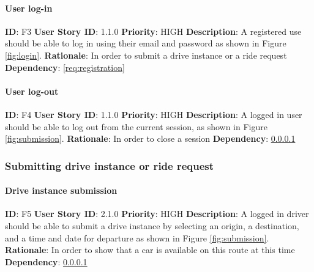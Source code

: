 \documentclass{article}
\begin{document}
\paragraph{User log-in}\label{req:log-in}
\textbf{ID}: F3\newline
\textbf{User Story ID}: 1.1.0\newline
\textbf{Priority}: HIGH\newline
\textbf{Description}: A registered use should be able to log in using their email and password as shown in Figure \ref{fig:login}. \newline
\textbf{Rationale}: In order to submit a drive instance or a ride request\newline
\textbf{Dependency}: \ref{req:registration}\newline

\paragraph{User log-out}\label{req:log-out}
\textbf{ID}: F4\newline
\textbf{User Story ID}: 1.1.0\newline
\textbf{Priority}: HIGH\newline
\textbf{Description}: A logged in user should be able to log out from the current session, as shown in Figure \ref{fig:submission}. \newline
\textbf{Rationale}: In order to close a session\newline
\textbf{Dependency}: \ref{req:log-in}\newline

\subsubsection{Submitting drive instance or ride request}

\paragraph{Drive instance submission}\label{req:driveInstance}
\textbf{ID}: F5\newline
\textbf{User Story ID}: 2.1.0\newline
\textbf{Priority}: HIGH\newline
\textbf{Description}: A logged in driver should be able to submit a drive instance by selecting an origin, a destination, and a time and date for departure as shown in Figure \ref{fig:submission}. \newline
\textbf{Rationale}: In order to show that a car is available on this route at this time\newline
\textbf{Dependency}: \ref{req:log-in}\newline
\end{document}
